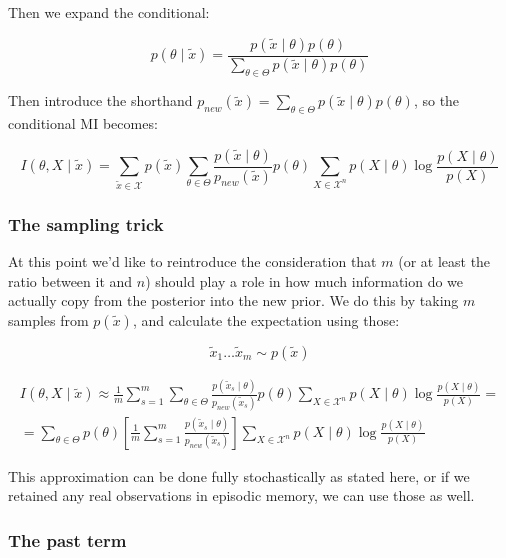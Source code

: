 \documentclass{article}
\begin{document}
Then we expand the conditional: 

\begin{equation}
    p(\theta \mid \tilde{x}) = \frac{p(\tilde{x} \mid \theta) p(\theta)}{\sum_{\theta \in \Theta} p(\tilde{x} \mid \theta) p(\theta)}
\end{equation}

Then introduce the shorthand $p_{new}(\tilde{x}) = \sum_{\theta \in \Theta} p(\tilde{x} \mid \theta) p(\theta)$, so the conditional MI becomes:

\begin{equation}
    I(\theta, X \mid \tilde{x}) = \sum_{\tilde{x} \in \mathcal{X}} p(\tilde{x}) \sum_{\theta \in \Theta} \frac{p(\tilde{x} \mid \theta)}{p_{new}(\tilde{x})} p(\theta) \sum_{X \in \mathcal{X}^n} p(X \mid \theta) \log \frac{p(X \mid \theta)}{p(X)}
\end{equation}

\subsubsection{The sampling trick}

At this point we'd like to reintroduce the consideration that $m$ (or at least the ratio between it and $n$) should play a role in how much information do we actually copy from the posterior into the new prior. We do this by taking $m$ samples from $p(\tilde{x})$, and calculate the expectation using those:

\begin{equation}
    \tilde{x}_1 \ldots \tilde{x}_m \sim p(\tilde{x})
\end{equation}

\begin{eqnarray}
    I(\theta, X \mid \tilde{x}) \approx \frac{1}{m}\sum_{s=1}^m \sum_{\theta \in \Theta} \frac{p(\tilde{x}_s \mid \theta)}{p_{new}(\tilde{x}_s)} p(\theta) \sum_{X \in \mathcal{X}^n} p(X \mid \theta) \log \frac{p(X \mid \theta)}{p(X)} = \\
    = \sum_{\theta \in \Theta} p(\theta) \left[ \frac{1}{m}\sum_{s=1}^m \frac{p(\tilde{x}_s \mid \theta)}{p_{new}(\tilde{x}_s)} \right]  \sum_{X \in \mathcal{X}^n} p(X \mid \theta) \log \frac{p(X \mid \theta)}{p(X)}
\end{eqnarray}

This approximation can be done fully stochastically as stated here, or if we retained any real observations in episodic memory, we can use those as well.

\subsubsection{The past term}
\end{document}
